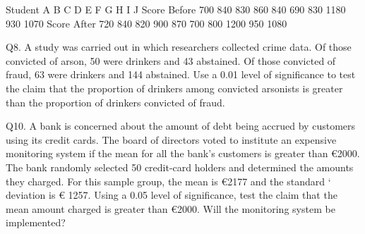 Student	A	B	C	D	E	F	G	H	I	J
Score Before	700	840	830	860	840	690	830	1180	930	1070
Score After	720	840	820	900	870	700	800	1200	950	1080















Q8. A study was carried out in which researchers collected crime data. Of those convicted of
arson, 50 were drinkers and 43 abstained. Of those convicted of fraud, 63 were drinkers and 144
abstained. Use a 0.01 level of significance to test the claim that the proportion of drinkers among
convicted arsonists is greater than the proportion of drinkers convicted of fraud.





Q10. A bank is concerned about the amount of debt being accrued by customers using its credit
cards. The board of directors voted to institute an expensive monitoring system if the mean for all
the bank’s customers is greater than €2000. The bank randomly selected 50 credit-card holders and
determined the amounts they charged. For this sample group, the mean is €2177 and the standard ‘
deviation is € 1257. Using a 0.05 level of significance,  test the claim that the mean amount charged
is greater than €2000. Will the monitoring system be implemented? 


